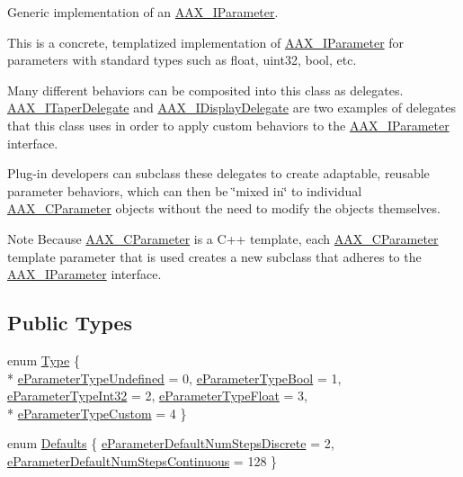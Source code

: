 Generic implementation of an \hyperlink{a00108}{A\+A\+X\+\_\+\+I\+Parameter}. 

This is a concrete, templatized implementation of \hyperlink{a00108}{A\+A\+X\+\_\+\+I\+Parameter} for parameters with standard types such as {\ttfamily float}, {\ttfamily uint32}, {\ttfamily bool}, etc.

Many different behaviors can be composited into this class as delegates. \hyperlink{a00114}{A\+A\+X\+\_\+\+I\+Taper\+Delegate} and \hyperlink{a00092}{A\+A\+X\+\_\+\+I\+Display\+Delegate} are two examples of delegates that this class uses in order to apply custom behaviors to the \hyperlink{a00108}{A\+A\+X\+\_\+\+I\+Parameter} interface.

Plug-\/in developers can subclass these delegates to create adaptable, reusable parameter behaviors, which can then be \char`\"{}mixed in\char`\"{} to individual \hyperlink{a00033}{A\+A\+X\+\_\+\+C\+Parameter} objects without the need to modify the objects themselves.

\begin{DoxyNote}{Note}
Because \hyperlink{a00033}{A\+A\+X\+\_\+\+C\+Parameter} is a C++ template, each \hyperlink{a00033}{A\+A\+X\+\_\+\+C\+Parameter} template parameter that is used creates a new subclass that adheres to the \hyperlink{a00108}{A\+A\+X\+\_\+\+I\+Parameter} interface. 
\end{DoxyNote}
\subsection*{Public Types}
\begin{DoxyCompactItemize}
\item 
enum \hyperlink{a00344_ga04704f13b4367b9e7430217d06c5e4bd}{Type} \{ \\*
\hyperlink{a00344_gga04704f13b4367b9e7430217d06c5e4bda15a8b9cd0a4d3acf30c476c7924b1753}{e\+Parameter\+Type\+Undefined} = 0, 
\hyperlink{a00344_gga04704f13b4367b9e7430217d06c5e4bda9ae3d0eca8e95a572dba6daaf52144c0}{e\+Parameter\+Type\+Bool} = 1, 
\hyperlink{a00344_gga04704f13b4367b9e7430217d06c5e4bda28e7aa1254f43cd377f0a0b9d2f29306}{e\+Parameter\+Type\+Int32} = 2, 
\hyperlink{a00344_gga04704f13b4367b9e7430217d06c5e4bda82c99fa80b68022242f17adbc1dbf0dc}{e\+Parameter\+Type\+Float} = 3, 
\\*
\hyperlink{a00344_gga04704f13b4367b9e7430217d06c5e4bda3503351122f63c767ca33d70aef69557}{e\+Parameter\+Type\+Custom} = 4
 \}
\item 
enum \hyperlink{a00344_ga6bd5a5ddc796fa3a9de77157bf444ca8}{Defaults} \{ \hyperlink{a00344_gga6bd5a5ddc796fa3a9de77157bf444ca8a511ee79dc3b6322b2facb41b2663be30}{e\+Parameter\+Default\+Num\+Steps\+Discrete} = 2, 
\hyperlink{a00344_gga6bd5a5ddc796fa3a9de77157bf444ca8a54c0d050e5b34d4eb85c840168ec4567}{e\+Parameter\+Default\+Num\+Steps\+Continuous} = 128
 \}
\end{DoxyCompactItemize}
